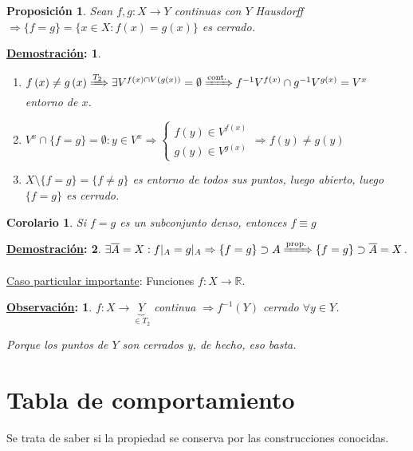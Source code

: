 \documentclass[10pt,a4paper,openright]{book}
\theoremstyle{break}
\newtheorem*{coro}{Corolario}
\newtheorem*{prop}{Proposición}
\newtheorem*{demo}{\underline{Demostración}:}
\newtheorem*{obs}{\underline{Observación}:}
\begin{document}
\begin{prop}
Sean $f, g: X \rightarrow Y$ continuas con $Y$ Hausdorff $\Rightarrow \{f = g\} = \{x \in X : f\left( x \right) = g\left( x \right)\}$ es cerrado.
\end{prop}
\begin{demo}
\begin{enumerate}
    \item $f\left( x \right) \neq g\left( x \right) \xRightarrow{T_2} \exists V^{f\left( x \right) \cap V\left( g\left( x \right) \right)} = \emptyset \xRightarrow{\text{cont.}} f^{-1}V^{f\left( x \right)} \cap g^{-1}V^{g\left( x \right)} = V^x$ entorno de $x$.

    \item $V^x \cap \{f = g\} = \emptyset: y \in V^x \Rightarrow \begin{cases}
        f\left( y \right) \in V^{f\left( x \right)} \\
        g\left( y \right) \in V^{g\left( x \right)} 
    \end{cases} \Rightarrow f\left( y \right) \neq g\left( y \right)$

    \item[1. + 2.] $X\setminus \{f = g\} = \{f \neq g\}$ es entorno de todos sus puntos, luego abierto, luego $\{f = g\}$ es cerrado.
\end{enumerate}
\end{demo}

\begin{coro}
Si $f = g$ es un subconjunto denso, entonces $f \equiv g$
\end{coro}
\begin{demo}
$\exists \overline{A} = X: f|_A = g|_A \Rightarrow \{f = g\} \supset A \xRightarrow{\text{prop.}} \{f = g\} \supset \overline{A} = X$.
\end{demo}

\underline{Caso particular importante}:
Funciones $f: X \rightarrow \mathbb{R}$.

\begin{obs}
$f: X \rightarrow \underbrace{Y}_{\in T_2}$ continua $\Rightarrow f^{-1}\left( Y \right)$ cerrado $\forall y \in Y$.

Porque  los puntos de $Y$ son cerrados y, de hecho, eso basta.
\end{obs}

\section{Tabla de comportamiento}%
\label{sec:tabla_de_comportamiento}
Se trata de saber si la propiedad se conserva por las construcciones conocidas.
\end{document}
